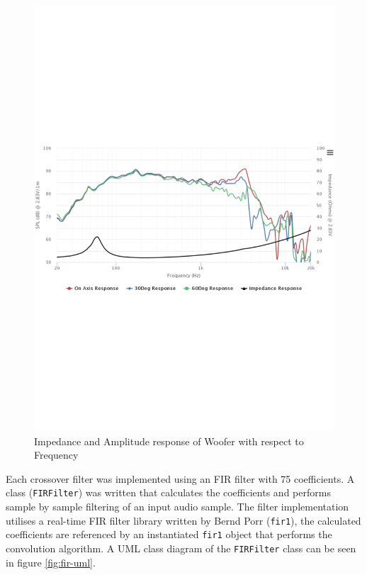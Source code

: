 \documentclass[main.tex]{subfiles}
\begin{document}
\begin{figure}[H]
    \centering
    \includegraphics[scale=0.5]{./figs/woofer-response.pdf}        
    \caption{Impedance and Amplitude response of Woofer with respect to Frequency\cite{woofer}}
    \label{fig:woofer-response}
\end{figure}

Each crossover filter was implemented using an FIR filter with 75 coefficients. 
A class (\lstinline{FIRFilter}) was written that calculates the coefficients and performs sample by sample filtering of an input audio sample. 
The filter implementation utilises a real-time FIR filter library written by Bernd Porr\cite{fir1} (\lstinline{fir1}), the calculated coefficients are referenced by an instantiated \lstinline{fir1} object that performs the convolution algorithm. 
A UML class diagram of the \lstinline{FIRFilter} class can be seen in figure \ref{fig:fir-uml}.
\end{document}
